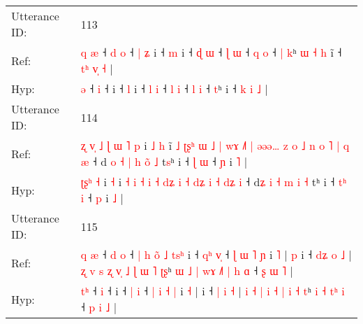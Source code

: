 \documentclass[10pt]{article}
\DeclareRobustCommand{\hl}[1]{{\textcolor{red}{#1}}}
\begin{document}
\begin{longtable}{ll}
 \\
\midrule
Utterance ID: & 113 \\
Ref: & \hl{q}\hl{ }\hl{æ} ˧\hl{ }\hl{d} \hl{o} ˧\hl{ }\hl{|}\hl{ }\hl{ʑ} i ˧ \hl{m} i ˧ \hl{ɖ} \hl{ɯ} ˧ \hl{ɭ} \hl{ɯ} ˧ \hl{q} \hl{o} ˧\hl{ }\hl{|} \hl{k}ʰ\hl{ }\hl{ɯ}\hl{ }\hl{˧}\hl{ }\hl{h} i\hl{̃} ˧ \hl{t}\hl{ʰ} \hl{v}\hl{̩} \hl{˧} |
 \\
Hyp: & \hl{}\hl{}\hl{ə} ˧\hl{}\hl{} \hl{i} ˧\hl{}\hl{}\hl{}\hl{} i ˧ \hl{l} i ˧ \hl{l} \hl{i} ˧ \hl{l} \hl{i} ˧ \hl{l} \hl{i} ˧\hl{}\hl{} \hl{t}ʰ\hl{}\hl{}\hl{}\hl{}\hl{}\hl{} i\hl{} ˧ \hl{}\hl{k} \hl{}\hl{i} \hl{˩} |
 \\
\midrule
Utterance ID: & 114 \\
Ref: & \hl{ʐ}\hl{ }\hl{v}\hl{̩}\hl{ }\hl{˩}\hl{ }\hl{ɭ}\hl{ }\hl{ɯ}\hl{ }\hl{˥} \hl{p} i\hl{ }\hl{˩} \hl{h} i\hl{̃}\hl{ }\hl{˩}\hl{ }\hl{ʈ}\hl{ʂ}\hl{ʰ}\hl{ }\hl{ɯ} \hl{˩} \hl{|} \hl{w}\hl{ɤ} \hl{˩}\hl{˥} \hl{|} \hl{ə}\hl{ə}\hl{ə}\hl{…} \hl{z} \hl{o} \hl{˩}\hl{ }\hl{n} \hl{o} \hl{˥} \hl{|}\hl{ }\hl{q} \hl{æ} ˧ d\hl{ }\hl{o} \hl{˧} \hl{|} \hl{h} \hl{o}\hl{̃} \hl{˩} t\hl{s}ʰ i ˧ \hl{}\hl{ɭ} \hl{ɯ} ˧ \hl{ɲ} i \hl{˥} |
 \\
Hyp: & \hl{}\hl{}\hl{}\hl{}\hl{}\hl{}\hl{}\hl{}\hl{}\hl{ʈ}\hl{ʂ}\hl{ʰ} \hl{˧} i\hl{}\hl{} \hl{˧} i\hl{}\hl{}\hl{}\hl{}\hl{}\hl{}\hl{}\hl{}\hl{} \hl{˧} \hl{i} \hl{}\hl{˧} \hl{}\hl{i} \hl{˧} \hl{}\hl{}\hl{d}\hl{ʑ} \hl{i} \hl{˧} \hl{}\hl{d}\hl{ʑ} \hl{i} \hl{˧} \hl{}\hl{d}\hl{ʑ} \hl{i} ˧ d\hl{}\hl{ʑ} \hl{i} \hl{˧} \hl{m} \hl{}\hl{i} \hl{˧} t\hl{}ʰ i ˧ \hl{t}\hl{ʰ} \hl{i} ˧ \hl{p} i \hl{˩} |
 \\
\midrule
Utterance ID: & 115 \\
Ref: & \hl{q}\hl{ }\hl{æ} ˧\hl{ }\hl{d} \hl{o} ˧\hl{ }\hl{|}\hl{ }\hl{h}\hl{ }\hl{o}\hl{̃}\hl{ }\hl{˩}\hl{ }\hl{t}\hl{s}\hl{ʰ} i ˧ \hl{q}\hl{ʰ} \hl{v}\hl{̩} ˧ \hl{ɭ} \hl{ɯ} \hl{˥} \hl{ɲ} i \hl{˥} |\hl{ }\hl{p} i ˧ \hl{d}\hl{ʑ} \hl{o} \hl{˩} |\hl{ }\hl{ʐ} \hl{v} \hl{s} \hl{ʐ} \hl{v}\hl{̩} \hl{˩} \hl{ɭ} \hl{ɯ} \hl{˥} \hl{ʈ}\hl{ʂ}ʰ\hl{ }\hl{ɯ}\hl{ }\hl{˩}\hl{ }\hl{|} \hl{w}\hl{ɤ} \hl{˩}\hl{˥} \hl{|}\hl{ }\hl{h} \hl{ɑ} ˧ \hl{ʂ} \hl{ɯ} \hl{˥} |
 \\
Hyp: & \hl{}\hl{t}\hl{ʰ} ˧\hl{}\hl{} \hl{i} ˧\hl{}\hl{}\hl{}\hl{}\hl{}\hl{}\hl{}\hl{}\hl{}\hl{}\hl{}\hl{}\hl{} i ˧ \hl{}\hl{|} \hl{}\hl{i} ˧ \hl{|} \hl{i} \hl{˧} \hl{|} i \hl{˧} |\hl{}\hl{} i ˧ \hl{}\hl{|} \hl{i} \hl{˧} |\hl{}\hl{} \hl{i} \hl{˧} \hl{|} \hl{}\hl{i} \hl{˧} \hl{|} \hl{i} \hl{˧} \hl{}\hl{t}ʰ\hl{}\hl{}\hl{}\hl{}\hl{}\hl{} \hl{}\hl{i} \hl{}\hl{˧} \hl{}\hl{t}\hl{ʰ} \hl{i} ˧ \hl{p} \hl{i} \hl{˩} |
 \\

\end{longtable}
\end{document}
